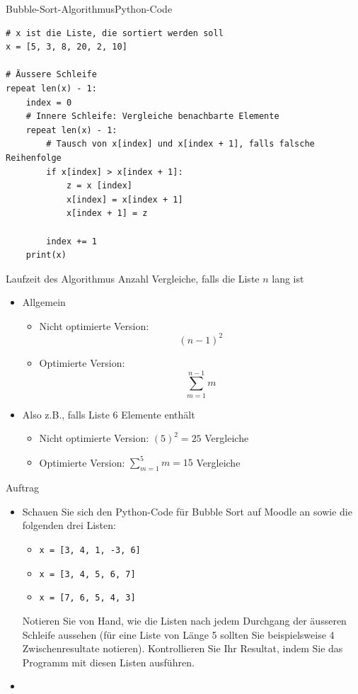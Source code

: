 \begin{frame}[fragile]{Bubble-Sort-Algorithmus}{Python-Code}
	\begin{lstlisting}
# x ist die Liste, die sortiert werden soll
x = [5, 3, 8, 20, 2, 10]

# Äussere Schleife
repeat len(x) - 1:
    index = 0
    # Innere Schleife: Vergleiche benachbarte Elemente
    repeat len(x) - 1:
    	# Tausch von x[index] und x[index + 1], falls falsche Reihenfolge
        if x[index] > x[index + 1]:
            z = x [index]
            x[index] = x[index + 1]
            x[index + 1] = z
         
        index += 1
    print(x)
	\end{lstlisting}

\end{frame}

\begin{frame}[fragile]{Laufzeit des Algorithmus}
Anzahl Vergleiche, falls die Liste $n$ lang ist
\begin{itemize}[<+->]
	\item Allgemein
	\begin{itemize}
	\item Nicht optimierte Version: 
	\[(n-1)^2\]
	\item Optimierte Version:
	\[\sum_{m=1}^{n-1}m \]
	\end{itemize}
	\item Also z.B., falls Liste 6 Elemente enthält
	\begin{itemize}
	\item Nicht optimierte Version: $(5)^2=25$ Vergleiche
	\item Optimierte Version: $\sum_{m=1}^{5}m = 15$ Vergleiche
	\end{itemize}
\end{itemize}
\end{frame}


\begin{frame}[fragile]{Auftrag}
\begin{itemize}
\item Schauen Sie sich den Python-Code für Bubble Sort auf Moodle an sowie die folgenden drei Listen:
\begin{itemize}
\item \lstinline|x = [3, 4, 1, -3, 6]|
\item \lstinline|x = [3, 4, 5, 6, 7]|
\item \lstinline|x = [7, 6, 5, 4, 3]|
\end{itemize}
Notieren Sie von Hand, wie die Listen nach jedem Durchgang der äusseren Schleife aussehen (für eine Liste von Länge 5 sollten Sie beispielsweise 4 Zwischenresultate notieren). Kontrollieren Sie Ihr Resultat, indem Sie das Programm mit diesen Listen ausführen.
\item {}
\end{itemize}
\end{frame}

